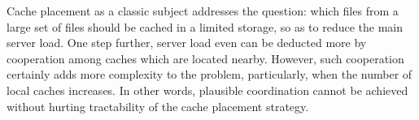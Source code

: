 \documentclass[journal,onecolumn]{IEEEtran}
\begin{document}
Cache placement as a classic subject addresses the question: which files from a large set of files should be cached in a limited storage, so as to reduce the main server load. One step further, server load even can be deducted more by cooperation among caches which are located nearby. However, such cooperation certainly adds more complexity to the problem, particularly, when the number of local caches increases. In other words, plausible coordination cannot be achieved without hurting tractability of the cache placement strategy.

\end{document}
